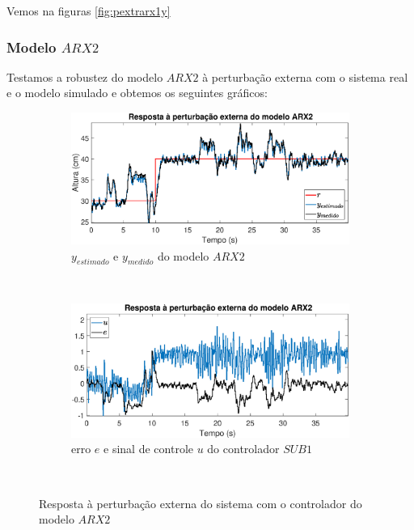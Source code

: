 Vemos na figuras \ref{fig:pextrarx1y}

\subsubsection{Modelo $ARX2$}
Testamos a robustez do modelo $ARX2$ à perturbação externa com o sistema real e o modelo simulado e obtemos os seguintes gráficos:
\begin{figure}[htb]
	\centering
	\begin{subfigure}[t]{0.48\textwidth}
		\includegraphics[width=1\linewidth]{pextrarx2y}
		\caption[$y_{estimado}$ e $y_{medido}$ do modelo $ARX2$]{$y_{estimado}$ e $y_{medido}$ do modelo $ARX2$}
		\label{fig:pextrarx2y}
	\end{subfigure}
	~ %
	\begin{subfigure}[t]{0.48\textwidth}
		\includegraphics[width=1\linewidth]{pextrarx2e}
		\caption[erro $e$ e sinal de controle $u$ do controlador $SUB1$]{erro $e$ e sinal de controle $u$ do controlador $SUB1$}
		\label{fig:pextrarx2e}
	\end{subfigure}
	~ %
	
	\caption{Resposta à perturbação externa do sistema com o controlador do modelo $ARX2$}\label{fig:pextrarx2}
\end{figure}

